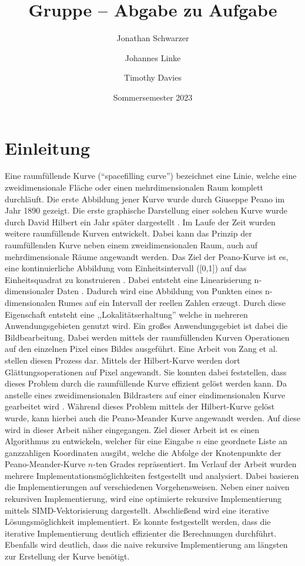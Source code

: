 \documentclass[course=erap]{aspdoc}
\author{Jonathan Schwarzer \and Johannes Linke \and Timothy Davies}
\date{Sommersemester 2023} %
\title{Gruppe \theGroup{} -- Abgabe zu Aufgabe \theNumber}
\begin{document}
\maketitle

\section{Einleitung}
Eine raumfüllende Kurve (``spacefilling curve'') bezeichnet eine Linie, welche eine zweidimensionale Fläche oder einen mehrdimensionalen Raum komplett durchläuft. Die erste Abbildung jener Kurve wurde durch Giuseppe Peano im Jahr 1890 gezeigt. Die erste graphische Darstellung einer solchen Kurve wurde durch David Hilbert ein Jahr später dargestellt \cite{wierum}. Im Laufe der Zeit wurden weitere raumfüllende Kurven entwickelt. Dabei kann das Prinzip der raumfüllenden Kurve neben einem zweidimensionalen Raum, auch auf mehrdimensionale Räume angewandt werden. Das Ziel der Peano-Kurve ist es, eine kontinuierliche Abbildung vom Einheitsintervall ([0,1]) auf das Einheitsquadrat zu konstruieren \cite{wierum}. Dabei entsteht eine Linearisierung n-dimensionaler Daten \cite{ober}. Dadurch wird eine Abbildung von Punkten eines n-dimensionalen Rumes auf ein Intervall der reellen Zahlen erzeugt. Durch diese Eigenschaft entsteht eine ,,Lokalitätserhaltung'' welche in mehreren Anwendungsgebieten genutzt wird. Ein großes Anwendungsgebiet ist dabei die Bildbearbeitung. Dabei werden mittels der raumfüllenden Kurven Operationen auf den einzelnen Pixel eines Bildes ausgeführt. Eine Arbeit von Zang et al. stellen diesen Prozess dar. Mittels der Hilbert-Kurve werden dort Glättungsoperationen auf Pixel angewandt. Sie konnten dabei feststellen, dass dieses Problem durch die raumfüllende Kurve effizient gelöst werden kann. Da anstelle eines zweidimensionalen Bildrasters auf einer eindimensionalen Kurve gearbeitet wird \cite{Zang}. Während dieses Problem mittels der Hilbert-Kurve gelöst wurde, kann hierbei auch die Peano-Meander Kurve angewandt werden. Auf diese wird in dieser Arbeit näher eingegangen. Ziel dieser Arbeit ist es einen Algorithmus zu entwickeln, welcher für eine Eingabe \(n\) eine geordnete Liste an ganzzahligen Koordinaten ausgibt, welche die Abfolge der Knotenpunkte der Peano-Meander-Kurve \(n\)-ten Grades repräsentiert. Im Verlauf der Arbeit wurden mehrere Implementationsmöglichkeiten festgestellt und analysiert. Dabei basieren die Implementierungen auf verschiedenen Vorgehensweisen. Neben einer naiven rekursiven Implementierung, wird eine optimierte rekursive Implementierung mittels SIMD-Vektorisierung dargestellt. Abschließend wird eine iterative Lösungsmöglichkeit implementiert. Es konnte festgestellt werden, dass die iterative Implementierung deutlich effizienter  die Berechnungen durchführt. Ebenfalls wird deutlich, dass die naive rekursive Implementierung am längsten zur Erstellung der Kurve benötigt.
\end{document}
